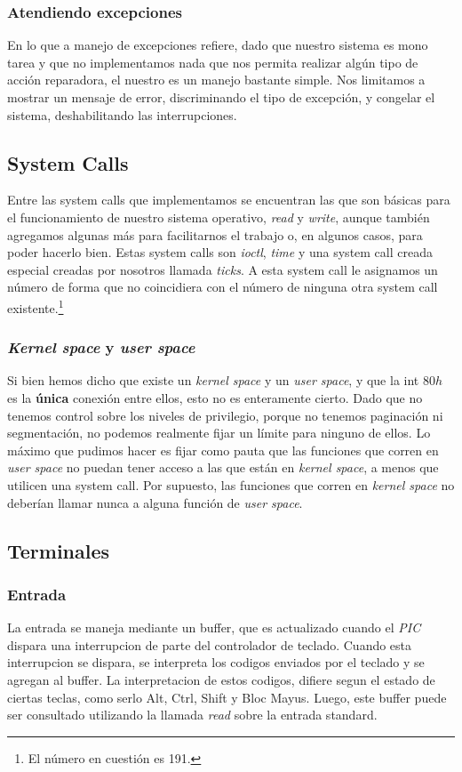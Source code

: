 \documentclass[a4paper,10pt]{article}
\begin{document}
	\subsubsection{Atendiendo excepciones}
	    En lo que a manejo de excepciones refiere, dado que nuestro sistema es mono tarea y que no implementamos nada que nos permita realizar algún tipo de acción 
	    reparadora, el nuestro es un manejo bastante simple. Nos limitamos a mostrar un mensaje de error, discriminando el tipo de excepción, y congelar el sistema,
	    deshabilitando las interrupciones.

    \subsection{System Calls}
	    Entre las system calls que implementamos se encuentran las que son básicas para el funcionamiento de nuestro sistema operativo, \textit{read} y \textit{write},
	    aunque también agregamos algunas más para facilitarnos el trabajo o, en algunos casos, para poder hacerlo bien. Estas system calls son \textit{ioctl}, 
	    \textit{time} y una system call creada especial creadas por nosotros llamada \textit{ticks}. A esta system call le asignamos un número de forma que no 
	    coincidiera con el número de ninguna otra system call existente.\footnote{El número en cuestión es 191.}
	
	\subsubsection{\textit{Kernel space} y \textit{user space}}
	    Si bien hemos dicho que existe un \textit{kernel space} y un \textit{user space}, y que la int $80h$ es la \textbf{única} conexión entre ellos, esto no es 
	    enteramente cierto. Dado que no tenemos control sobre los niveles de privilegio, porque no tenemos paginación ni segmentación, no podemos realmente fijar un
	    límite para ninguno de ellos. Lo máximo que pudimos hacer es fijar como pauta que las funciones que corren en \textit{user space} no puedan tener acceso a
	    las que están en \textit{kernel space}, a menos que utilicen una system call. Por supuesto, las funciones que corren en \textit{kernel space} no deberían 
	    llamar nunca a alguna función de \textit{user space}.

    \subsection{Terminales}
        \subsubsection{Entrada}
            La entrada se maneja mediante un buffer, que es actualizado cuando el \textit{PIC} dispara una interrupcion de parte del controlador de teclado.
            Cuando esta interrupcion se dispara, se interpreta los codigos enviados por el teclado y se agregan al buffer.
            La interpretacion de estos codigos, difiere segun el estado de ciertas teclas, como serlo Alt, Ctrl, Shift y Bloc Mayus.
            Luego, este buffer puede ser consultado utilizando la llamada \textit{read} sobre la entrada standard.
\end{document}
